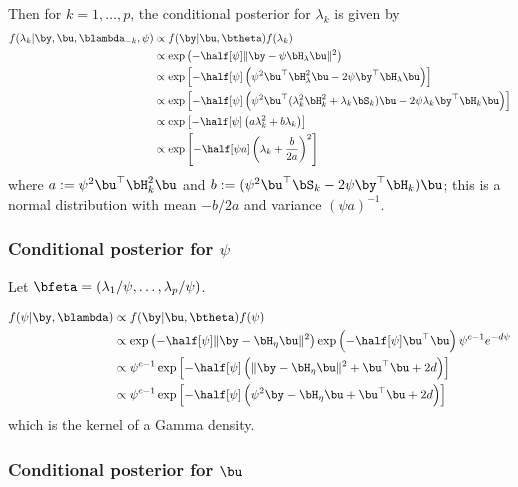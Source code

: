 \documentclass[english, 11pt]{article}
\begin{document}
Then for $k=1,\dots,p$, the conditional posterior for $\lambda_k$ is given by
\begin{align*}
	f(\lambda_k | \by, \bu, \blambda_{-k}, \psi) &\propto f(\by | \bu, \btheta) f(\lambda_k) \\
	&\propto \exp\left(-\half[\psi] \Vert \by - \psi\Hlam\bu \Vert^2 \right)  \\
	&\propto \exp\left[-\half[\psi] \left( \psi^2\bu^\top\Hlam^2\bu - 2\psi\by^\top \Hlam\bu \right) \right]  \\
	&\propto \exp\left[-\half[\psi] \left( \psi^2\bu^\top(\lambda_k^2\bH_k^2 + \lambda_k\bS_k) \bu - 2\psi\lambda_k \by^\top \bH_k \bu \right) \right]  \\
	&\propto \exp\left[-\half[\psi] \left( a\lambda_k^2 + b\lambda_k \right) \right] \\
	&\propto \exp\left[-\half[\psi a] \left( \lambda_k + \frac{b}{2a} \right)^2 \right] \\
\end{align*}
where $a := \psi^2\bu^\top \bH_k^2 \bu$ and $b := (\psi^2\bu^\top \bS_k - 2\psi\by^\top \bH_k) \bu$; this is a normal distribution with mean $-b/2a$ and variance $(\psi a)^{-1}$.

\subsubsection{Conditional posterior for $\psi$}

Let $\bfeta = (\lambda_1/\psi, \dots, \lambda_p/\psi)$.

\begin{align*}
	f(\psi| \by, \blambda) &\propto f(\by | \bu, \btheta) f(\psi) \\
	&\propto \exp\left(-\half[\psi] \Vert \by - \bH_\eta\bu \Vert^2 \right)\exp\left(-\half[\psi] \bu^\top\bu \right) \psi^{c-1}e^{-d\psi} \\
	&\propto \psi^{c-1} \exp \left[- \half[\psi] \left( \Vert \by - \bH_\eta\bu \Vert^2  + \bu^\top\bu + 2d \right) \right] \\
	&\propto \psi^{c-1} \exp \left[- \half[\psi] \left( \psi^2\by - \bH_\eta\bu   + \bu^\top\bu + 2d \right) \right]
\end{align*}
which is the kernel of a Gamma density.

\subsubsection{Conditional posterior for $\bu$}
\end{document}
